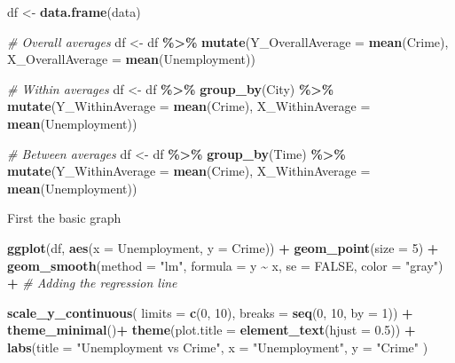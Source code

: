 \documentclass[
]{book}
\newenvironment{Shaded}{\begin{snugshade}}{\end{snugshade}}
\newcommand{\AttributeTok}[1]{\textcolor[rgb]{0.13,0.29,0.53}{#1}}
\newcommand{\CommentTok}[1]{\textcolor[rgb]{0.56,0.35,0.01}{\textit{#1}}}
\newcommand{\ConstantTok}[1]{\textcolor[rgb]{0.56,0.35,0.01}{#1}}
\newcommand{\DecValTok}[1]{\textcolor[rgb]{0.00,0.00,0.81}{#1}}
\newcommand{\FloatTok}[1]{\textcolor[rgb]{0.00,0.00,0.81}{#1}}
\newcommand{\FunctionTok}[1]{\textcolor[rgb]{0.13,0.29,0.53}{\textbf{#1}}}
\newcommand{\NormalTok}[1]{#1}
\newcommand{\OtherTok}[1]{\textcolor[rgb]{0.56,0.35,0.01}{#1}}
\newcommand{\SpecialCharTok}[1]{\textcolor[rgb]{0.81,0.36,0.00}{\textbf{#1}}}
\newcommand{\StringTok}[1]{\textcolor[rgb]{0.31,0.60,0.02}{#1}}
\begin{document}
\begin{Shaded}
\begin{Highlighting}[]
\NormalTok{df }\OtherTok{\textless{}{-}} \FunctionTok{data.frame}\NormalTok{(data)}

\CommentTok{\# Overall averages}
\NormalTok{df }\OtherTok{\textless{}{-}}\NormalTok{ df }\SpecialCharTok{\%\textgreater{}\%}
  \FunctionTok{mutate}\NormalTok{(}\AttributeTok{Y\_OverallAverage =} \FunctionTok{mean}\NormalTok{(Crime),}
         \AttributeTok{X\_OverallAverage =} \FunctionTok{mean}\NormalTok{(Unemployment))}

\CommentTok{\# Within averages         }
\NormalTok{df }\OtherTok{\textless{}{-}}\NormalTok{ df }\SpecialCharTok{\%\textgreater{}\%}
  \FunctionTok{group\_by}\NormalTok{(City) }\SpecialCharTok{\%\textgreater{}\%}
  \FunctionTok{mutate}\NormalTok{(}\AttributeTok{Y\_WithinAverage =} \FunctionTok{mean}\NormalTok{(Crime), }
         \AttributeTok{X\_WithinAverage =} \FunctionTok{mean}\NormalTok{(Unemployment))       }

\CommentTok{\# Between averages}
\NormalTok{df }\OtherTok{\textless{}{-}}\NormalTok{ df }\SpecialCharTok{\%\textgreater{}\%}
  \FunctionTok{group\_by}\NormalTok{(Time) }\SpecialCharTok{\%\textgreater{}\%}
  \FunctionTok{mutate}\NormalTok{(}\AttributeTok{Y\_WithinAverage =} \FunctionTok{mean}\NormalTok{(Crime), }
         \AttributeTok{X\_WithinAverage =} \FunctionTok{mean}\NormalTok{(Unemployment))}
\end{Highlighting}
\end{Shaded}

First the basic graph

\begin{Shaded}
\begin{Highlighting}[]
\FunctionTok{ggplot}\NormalTok{(df, }\FunctionTok{aes}\NormalTok{(}\AttributeTok{x =}\NormalTok{ Unemployment, }\AttributeTok{y =}\NormalTok{ Crime)) }\SpecialCharTok{+}
  \FunctionTok{geom\_point}\NormalTok{(}\AttributeTok{size =} \DecValTok{5}\NormalTok{) }\SpecialCharTok{+}
  \FunctionTok{geom\_smooth}\NormalTok{(}\AttributeTok{method =} \StringTok{"lm"}\NormalTok{, }\AttributeTok{formula =}\NormalTok{ y }\SpecialCharTok{\textasciitilde{}}\NormalTok{ x, }\AttributeTok{se =} \ConstantTok{FALSE}\NormalTok{, }\AttributeTok{color =} \StringTok{"gray"}\NormalTok{) }\SpecialCharTok{+}  \CommentTok{\# Adding the regression line}

  \FunctionTok{scale\_y\_continuous}\NormalTok{(}
    \AttributeTok{limits =} \FunctionTok{c}\NormalTok{(}\DecValTok{0}\NormalTok{, }\DecValTok{10}\NormalTok{),}
    \AttributeTok{breaks =} \FunctionTok{seq}\NormalTok{(}\DecValTok{0}\NormalTok{, }\DecValTok{10}\NormalTok{, }\AttributeTok{by =} \DecValTok{1}\NormalTok{)) }\SpecialCharTok{+}
  \FunctionTok{theme\_minimal}\NormalTok{()}\SpecialCharTok{+}
  \FunctionTok{theme}\NormalTok{(}\AttributeTok{plot.title =} \FunctionTok{element\_text}\NormalTok{(}\AttributeTok{hjust =} \FloatTok{0.5}\NormalTok{)) }\SpecialCharTok{+}
  \FunctionTok{labs}\NormalTok{(}\AttributeTok{title =} \StringTok{"Unemployment vs Crime"}\NormalTok{,}
       \AttributeTok{x =} \StringTok{"Unemployment"}\NormalTok{,}
       \AttributeTok{y =} \StringTok{"Crime"}
\NormalTok{       )}
\end{Highlighting}
\end{Shaded}
\end{document}
